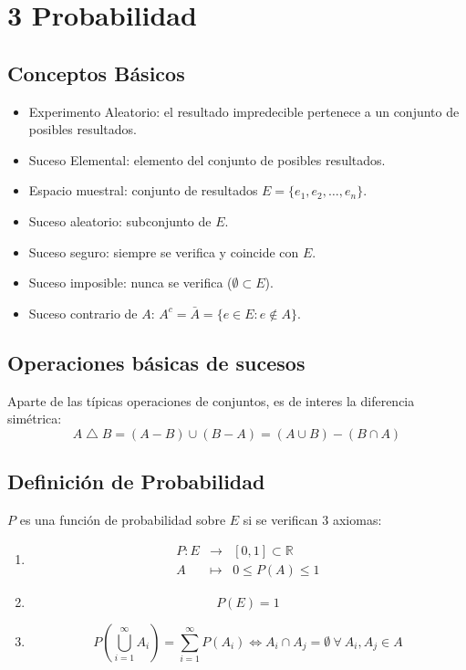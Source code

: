 \documentclass[10pt,a4paper]{book}
\begin{document}
\setcounter{chapter}{3}
\chapter*{\color{blue}\textbf{3} \color{black} Probabilidad}
\setcounter{section}{0}
\section{Conceptos Básicos}
\begin{itemize}
\item Experimento Aleatorio: el resultado impredecible pertenece a un conjunto de posibles resultados.
\item Suceso Elemental: elemento del conjunto de posibles resultados.
\item Espacio muestral: conjunto de resultados $E = \{e_1,e_2,\dots,e_n\}$.
\item Suceso aleatorio: subconjunto de $E$.
\item Suceso seguro: siempre se verifica y coincide con $E$.
\item Suceso imposible: nunca se verifica ($\emptyset\subset E$).
\item Suceso contrario de $A$: $A^c = \bar{A} = \{e\in E : e\notin A\}$.
\end{itemize}

\section{Operaciones básicas de sucesos}
Aparte de las típicas operaciones de conjuntos, es de interes la diferencia simétrica:
\[A\bigtriangleup B = (A-B)\cup(B-A)=(A\cup B)-(B\cap A)\]

\section{Definición de Probabilidad}
$P$ es una función de probabilidad sobre $E$ si se verifican 3 axiomas:
\begin{enumerate}
\item \[
\begin{array}{rcl}
	P : E&\longrightarrow&[0,1]\subset\mathbb{R}\\
	A&\longmapsto&0\leq P(A) \leq 1
\end{array}\]
\item \[P(E) = 1\]
\item \[P\left(\bigcup_{i=1}^\infty A_i\right) = \sum_{i=1}^\infty P(A_i)\iff A_i\cap A_j =\emptyset\:\forall\:A_i,A_j\in A\]
\end{enumerate}
\end{document}
